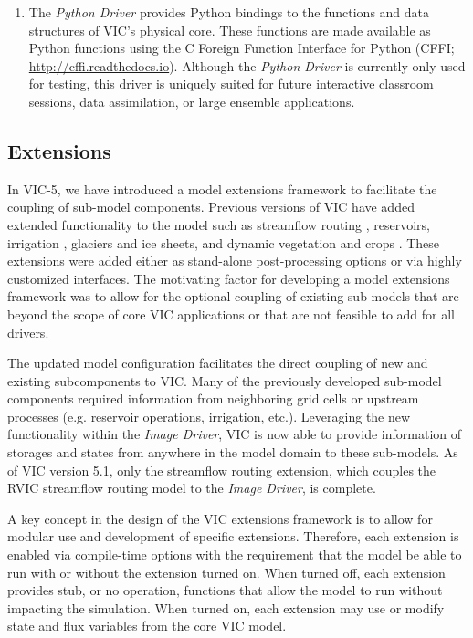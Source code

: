 \documentclass[gmd, manuscript]{copernicus}
\begin{document}
\begin{enumerate}
      \item The \textit{Python Driver} provides Python bindings to the functions and data structures of VIC’s physical core. These functions are made available as Python functions using the C Foreign Function Interface for Python (CFFI; \url{http://cffi.readthedocs.io}). Although the \textit{Python Driver} is currently only used for testing, this driver is uniquely suited for future interactive classroom sessions, data assimilation, or large ensemble applications.
    \end{enumerate}

    \subsection{Extensions}
      \label{sec:extensions}
      In VIC-5, we have introduced a model extensions framework to facilitate the coupling of sub-model components. Previous versions of VIC have added extended functionality to the model such as streamflow routing \citep{Lohmann_1996, Hamman_2017a}, reservoirs, irrigation \citep{Haddeland_2006}, glaciers and ice sheets, and dynamic vegetation and crops \citep{Adam_2015}. These extensions were added either as stand-alone post-processing options or via highly customized interfaces. The motivating factor for developing a model extensions framework was to allow for the optional coupling of existing sub-models that are beyond the scope of core VIC applications or that are not feasible to add for all drivers.

      The updated model configuration facilitates the direct coupling of new and existing subcomponents to VIC. Many of the previously developed sub-model components required information from neighboring grid cells or upstream processes (e.g. reservoir operations, irrigation, etc.). Leveraging the new functionality within the \textit{Image Driver}, VIC is now able to provide information of storages and states from anywhere in the model domain to these sub-models. As of VIC version 5.1, only the streamflow routing extension, which couples the RVIC streamflow routing model \citep{Hamman_2017a} to the \textit{Image Driver}, is complete.

      A key concept in the design of the VIC extensions framework is to allow for modular use and development of specific extensions. Therefore, each extension is enabled via compile-time options with the requirement that the model be able to run with or without the extension turned on. When turned off, each extension provides stub, or no operation, functions that allow the model to run without impacting the simulation. When turned on, each extension may use or modify state and flux variables from the core VIC model.
\end{document}
